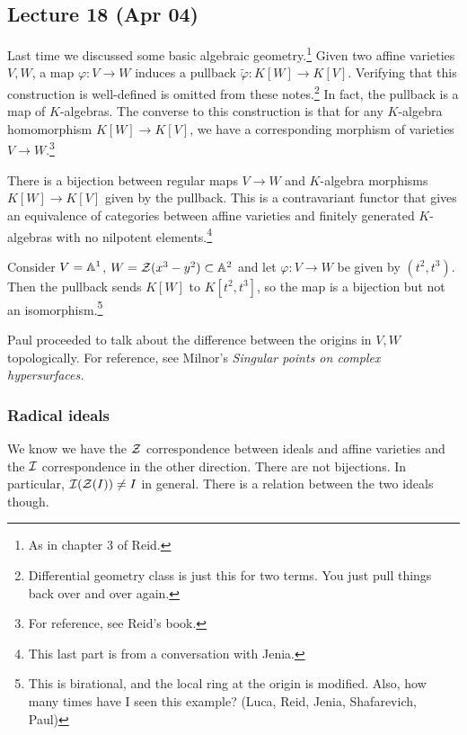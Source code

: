 \message{ !name(notes.tex)}\documentclass[10pt, twoside]{article}
\begin{document}
        \subsection{Lecture 18 (Apr 04)}
        Last time we discussed some basic algebraic geometry.\footnote{As in chapter 3 of Reid.} Given two affine varieties $V,W$, a map $\varphi:V\to W$ induces a pullback $\widetilde{\varphi}:K[W]\to K[V]$. Verifying that this construction is well-defined is omitted from these notes.\footnote{Differential geometry class is just this for two terms. You just pull things back over and over again.} In fact, the pullback is a map of $K$-algebras. The converse to this construction is that for any $K$-algebra homomorphism $K[W] \to K[V]$, we have a corresponding morphism of varieties $V \to W$.\footnote{For reference, see Reid's book.}

        \begin{thm}
            There is a bijection between regular maps $V \to W$ and $K$-algebra morphisms $K[W] \to K[V]$ given by the pullback. This is a contravariant functor that gives an equivalence of categories between affine varieties and finitely generated $K$-algebras with no nilpotent elements.\footnote{This last part is from a conversation with Jenia.}
        \end{thm}

        \begin{exm}
            Consider $V = \mathbb{A}^1$, $W = \mathcal{Z}(x^3-y^2) \subset \mathbb{A}^2$ and let $\varphi: V \to W$ be given by $(t^2, t^3)$. Then the pullback sends $K[W]$ to $K[t^2,t^3]$, so the map is a bijection but not an isomorphism.\footnote{This is birational, and the local ring at the origin is modified. Also, how many times have I seen this example? (Luca, Reid, Jenia, Shafarevich, Paul)}
        \end{exm}

        Paul proceeded to talk about the difference between the origins in $V,W$ topologically. For reference, see Milnor's \emph{Singular points on complex hypersurfaces.}

        \subsubsection{Radical ideals}
        We know we have the $\mathcal{Z}$ correspondence between ideals and affine varieties and the $\mathcal{I}$ correspondence in the other direction. There are not bijections. In particular, $\mathcal{I}(\mathcal{Z}(I)) \neq I$ in general. There is a relation between the two ideals though.
\end{document}
